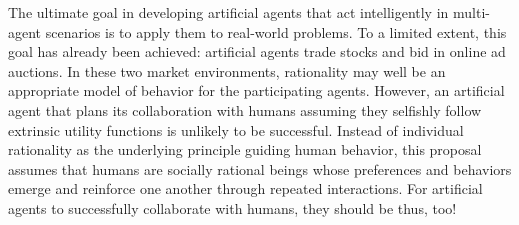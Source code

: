 The ultimate goal in developing artificial agents that act
intelligently in multi-agent scenarios is to apply them to real-world
problems.  To a limited extent, this goal has already been achieved:
artificial agents trade stocks and bid in online ad auctions.  In
these two market environments, rationality may well be an appropriate
model of behavior for the participating agents.  However,
an artificial agent that plans its collaboration with humans assuming
they selfishly follow extrinsic utility functions is unlikely to be
successful.  Instead of individual rationality as the underlying
principle guiding human behavior, this proposal assumes that humans
are socially rational beings whose preferences and behaviors emerge
and reinforce one another through repeated interactions.  For
artificial agents to successfully collaborate with humans, they should
be thus, too!

~\cite{gal04}
